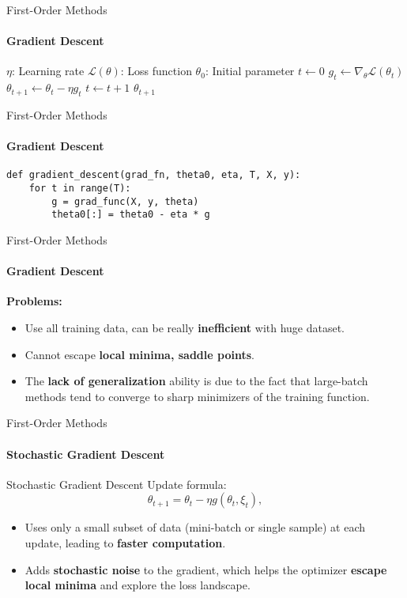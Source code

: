 \documentclass{beamer}
\begin{document}
\begin{frame}[fragile]{First-Order Methods}
\framesubtitle{Gradient Descent}
\small
\begin{algorithm}[H]
\caption{Gradient Descent}
\begin{algorithmic}[1]
\Require $\eta$: Learning rate
\Require $\mathcal{L}(\theta)$: Loss function
\Require $\theta_0$: Initial parameter
\State $t \gets 0$
 
    \State $g_t \gets \nabla_\theta \mathcal{L}(\theta_t)$ 
    \State $\theta_{t+1} \gets \theta_t - \eta g_t$ 
    \State $t \gets t + 1$ 
\EndWhile
\State \Return $\theta_{t+1}$
\end{algorithmic}
\end{algorithm}
\end{frame}

\begin{frame}[fragile]{First-Order Methods}
\framesubtitle{Gradient Descent}
\begin{verbatim}
def gradient_descent(grad_fn, theta0, eta, T, X, y):
    for t in range(T):
        g = grad_func(X, y, theta)
        theta0[:] = theta0 - eta * g
\end{verbatim}
\end{frame}

\begin{frame}{First-Order Methods}
\framesubtitle{Gradient Descent}
\textbf{Problems:}
\begin{itemize}
    \item Use all training data, can be really \textbf{inefficient} with huge dataset.
    \item Cannot escape \textbf{local minima, saddle points}.
    \item The \textbf{lack of generalization} ability is due to the fact that large-batch methods tend to converge to sharp minimizers of the training function.
\end{itemize}
\end{frame}

\begin{frame}{First-Order Methods}
\framesubtitle{Stochastic Gradient Descent}
\begin{block}{Stochastic Gradient Descent}
Update formula:
\[
\theta_{t+1} = \theta_t - \eta g(\theta_t, \xi_t ),
\]
\end{block}
\begin{itemize}
    \item Uses only a small subset of data (mini-batch or single sample) at each update, leading to \textbf{faster computation}.
    \item Adds \textbf{stochastic noise} to the gradient, which helps the optimizer \textbf{escape local minima} and explore the loss landscape.
\end{itemize}
\end{frame}
\end{document}
